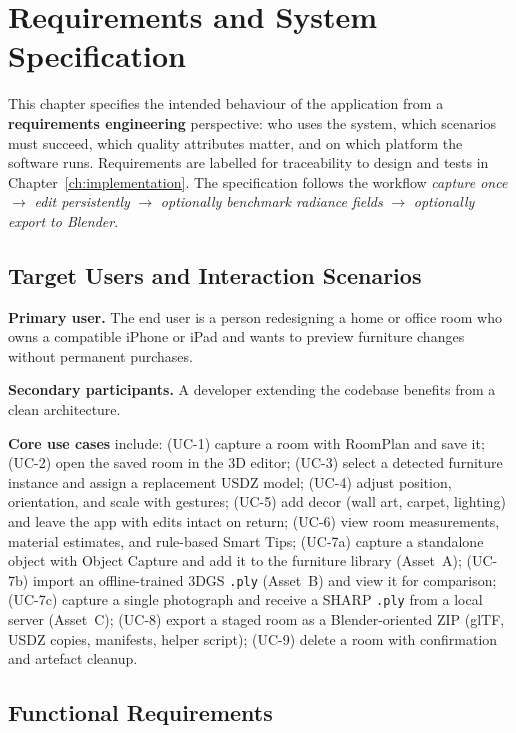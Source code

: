 \chapter{Requirements and System Specification}
\label{ch:requirements}

This chapter specifies the intended behaviour of the application from a \textbf{requirements engineering} perspective: who uses the system, which scenarios must succeed, which quality attributes matter, and on which platform the software runs. Requirements are labelled for traceability to design and tests in Chapter~\ref{ch:implementation}. The specification follows the workflow \emph{capture once} $\rightarrow$ \emph{edit persistently} $\rightarrow$ \emph{optionally benchmark radiance fields} $\rightarrow$ \emph{optionally export to Blender}.

\section{Target Users and Interaction Scenarios}

\textbf{Primary user.} The end user is a person redesigning a home or office room who owns a compatible iPhone or iPad and wants to preview furniture changes without permanent purchases.

\textbf{Secondary participants.} A developer extending the codebase benefits from a clean architecture.

\textbf{Core use cases} include: (UC-1) capture a room with RoomPlan and save it; (UC-2) open the saved room in the 3D editor; (UC-3) select a detected furniture instance and assign a replacement USDZ model; (UC-4) adjust position, orientation, and scale with gestures; (UC-5) add decor (wall art, carpet, lighting) and leave the app with edits intact on return; (UC-6) view room measurements, material estimates, and rule-based Smart Tips; (UC-7a) capture a standalone object with Object Capture and add it to the furniture library (Asset~A); (UC-7b) import an offline-trained 3DGS \texttt{.ply} (Asset~B) and view it for comparison; (UC-7c) capture a single photograph and receive a SHARP \texttt{.ply} from a local server (Asset~C); (UC-8) export a staged room as a Blender-oriented ZIP (glTF, USDZ copies, manifests, helper script); (UC-9) delete a room with confirmation and artefact cleanup.

\section{Functional Requirements}
\label{sec:func_req}

